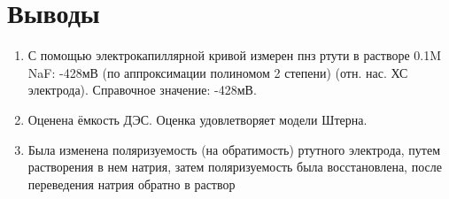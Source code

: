 \documentclass[a4paper, 12pt]{article}
\begin{document}
 \section{Выводы}
\begin{enumerate}
    \item С помощью электрокапиллярной кривой измерен пнз ртути в растворе 0.1M NaF: -428мВ (по аппроксимации полиномом 2 степени) (отн. нас. ХС электрода). Справочное значение: -428мВ.
    \item Оценена ёмкость ДЭС. Оценка удовлетворяет модели Штерна.
    \item Была изменена поляризуемость (на обратимость) ртутного электрода, путем растворения в нем натрия, затем поляризуемость была восстановлена, после переведения натрия обратно в раствор

\end{enumerate}
\end{document}
